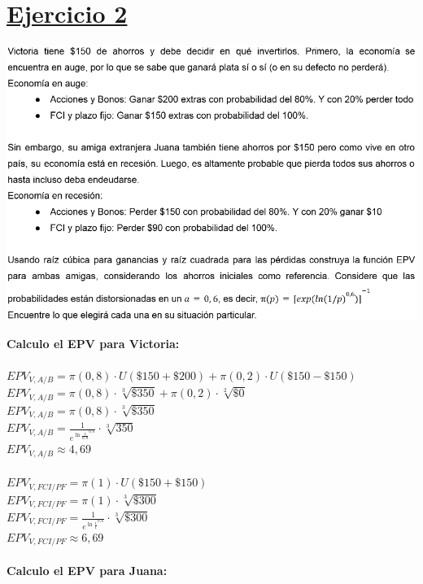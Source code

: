 \documentclass{article}
\begin{document}
    \section*{\underline{Ejercicio 2}}
        \begin{center}
            \includegraphics[width=0.8  \linewidth]{figs/adicionales-faciles-dos.png}
        \end{center}
        \textbf{Calculo el EPV para Victoria:}
        \\
        \\
        \(EPV_{V, A/B} = \pi(0,8) \cdot U(\mathdollar 150 + \mathdollar 200) + \pi(0,2) \cdot U(\mathdollar 150 - \mathdollar 150)\)
        \\
        \(EPV_{V, A/B} = \pi(0,8) \cdot \sqrt[3]{\mathdollar 350} + \pi(0,2) \cdot \sqrt[2]{\mathdollar 0}\)
        \\
        \(EPV_{V, A/B} = \pi(0,8) \cdot \sqrt[3]{\mathdollar 350}\)
        \\
        \(EPV_{V, A/B} = \frac{1}{e^{\ln{\frac{1}{0,8}}^{0,6}}} \cdot \sqrt[3]{350}\)
        \\
        \(EPV_{V, A/B} \approx 4,69\)
        \\
        \\
        \(EPV_{V, FCI/PF} = \pi(1) \cdot U(\mathdollar 150 + \mathdollar 150)\)
        \\
        \(EPV_{V, FCI/PF} = \pi(1) \cdot \sqrt[3]{\mathdollar 300}\)
        \\
        \(EPV_{V, FCI/PF} = \frac{1}{e^{\ln{\frac{1}{1}}^{0,6}}} \cdot \sqrt[3]{\mathdollar 300}\)
        \\
        \(EPV_{V, FCI/PF} \approx 6,69\)
        \\
        \\
        \textbf{Calculo el EPV para Juana:}
        \\
\end{document}
